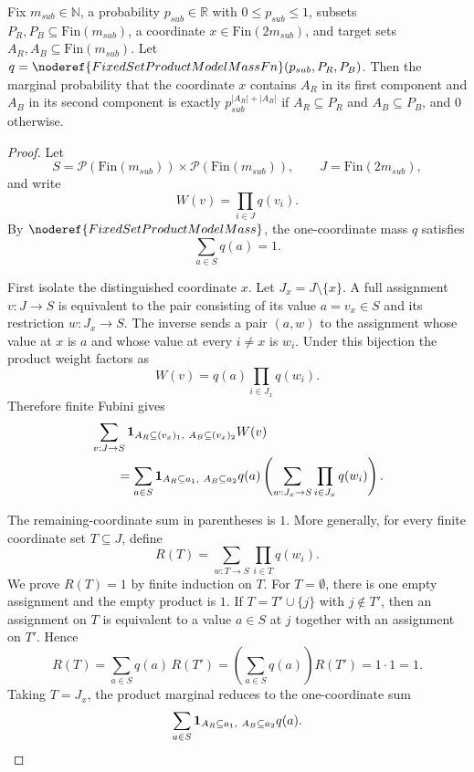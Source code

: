 \begin{helper}
Fix $m_{sub} \in \mathbb{N}$, a probability $p_{sub} \in \mathbb{R}$ with $0 \le p_{sub} \le 1$, subsets $P_R, P_B \subseteq \mathrm{Fin}(m_{sub})$, a coordinate $x \in \mathrm{Fin}(2m_{sub})$, and target sets $A_R, A_B \subseteq \mathrm{Fin}(m_{sub})$.
Let $q = \noderef{FixedSetProductModelMassFn}(p_{sub}, P_R, P_B)$.
Then the marginal probability that the coordinate $x$ contains $A_R$ in its first component and $A_B$ in its second component is exactly $p_{sub}^{|A_R| + |A_B|}$ if $A_R \subseteq P_R$ and $A_B \subseteq P_B$, and $0$ otherwise.
\end{helper}
\begin{proof}
Let
\[
S=\mathcal P(\mathrm{Fin}(m_{sub}))\times
  \mathcal P(\mathrm{Fin}(m_{sub})),\qquad
J=\mathrm{Fin}(2m_{sub}),
\]
and write
\[
W(v)=\prod_{i\in J}q(v_i).
\]
By \(\noderef{FixedSetProductModelMass}\), the one-coordinate mass \(q\)
satisfies
\[
\sum_{a\in S}q(a)=1.
\]

First isolate the distinguished coordinate \(x\).  Let
\(J_x=J\setminus\{x\}\).  A full assignment \(v:J\to S\) is equivalent to
the pair consisting of its value \(a=v_x\in S\) and its restriction
\(w:J_x\to S\).  The inverse sends a pair \((a,w)\) to the assignment whose
value at \(x\) is \(a\) and whose value at every \(i\ne x\) is \(w_i\).
Under this bijection the product weight factors as
\[
W(v)=q(a)\prod_{i\in J_x}q(w_i).
\]
Therefore finite Fubini gives
\[
\begin{aligned}
&\sum_{v:J\to S}
{\bf 1}_{A_R\subseteq(v_x)_1,\ A_B\subseteq(v_x)_2}W(v)\\
&\qquad =
\sum_{a\in S}
{\bf 1}_{A_R\subseteq a_1,\ A_B\subseteq a_2}q(a)
\left(
\sum_{w:J_x\to S}\prod_{i\in J_x}q(w_i)
\right).
\end{aligned}
\]

The remaining-coordinate sum in parentheses is \(1\).  More generally, for
every finite coordinate set \(T\subseteq J\), define
\[
R(T)=\sum_{w:T\to S}\prod_{i\in T}q(w_i).
\]
We prove \(R(T)=1\) by finite induction on \(T\).  For \(T=\emptyset\), there
is one empty assignment and the empty product is \(1\).  If
\(T=T'\cup\{j\}\) with \(j\notin T'\), then an assignment on \(T\) is
equivalent to a value \(a\in S\) at \(j\) together with an assignment on
\(T'\).  Hence
\[
R(T)=\sum_{a\in S}q(a)\,R(T')
=\left(\sum_{a\in S}q(a)\right)R(T')=1\cdot1=1.
\]
Taking \(T=J_x\), the product marginal reduces to the one-coordinate sum
\[
\sum_{a\in S}
{\bf 1}_{A_R\subseteq a_1,\ A_B\subseteq a_2}q(a).
\]


\end{proof}

